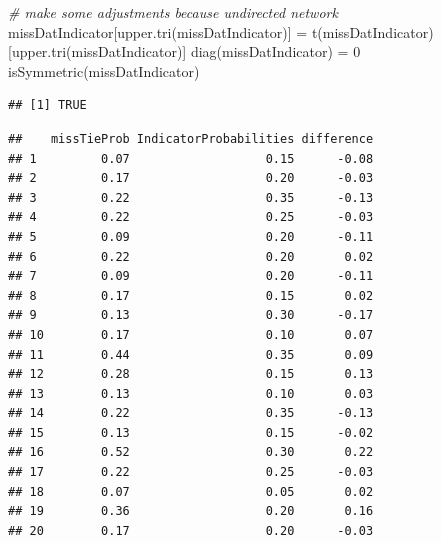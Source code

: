 \documentclass[
]{article}
\newenvironment{Shaded}{\begin{snugshade}}{\end{snugshade}}
\newcommand{\AttributeTok}[1]{\textcolor[rgb]{0.77,0.63,0.00}{#1}}
\newcommand{\CommentTok}[1]{\textcolor[rgb]{0.56,0.35,0.01}{\textit{#1}}}
\newcommand{\DecValTok}[1]{\textcolor[rgb]{0.00,0.00,0.81}{#1}}
\newcommand{\FunctionTok}[1]{\textcolor[rgb]{0.00,0.00,0.00}{#1}}
\newcommand{\NormalTok}[1]{#1}
\newcommand{\OtherTok}[1]{\textcolor[rgb]{0.56,0.35,0.01}{#1}}
\newcommand{\SpecialCharTok}[1]{\textcolor[rgb]{0.00,0.00,0.00}{#1}}
\begin{document}
\begin{Shaded}
\begin{Highlighting}[]
\CommentTok{\# make some adjustments because undirected network}
\NormalTok{missDatIndicator[}\FunctionTok{upper.tri}\NormalTok{(missDatIndicator)] }\OtherTok{=} \FunctionTok{t}\NormalTok{(missDatIndicator)[}\FunctionTok{upper.tri}\NormalTok{(missDatIndicator)]}
\FunctionTok{diag}\NormalTok{(missDatIndicator) }\OtherTok{=} \DecValTok{0}
\FunctionTok{isSymmetric}\NormalTok{(missDatIndicator)}
\end{Highlighting}
\end{Shaded}

\begin{verbatim}
## [1] TRUE
\end{verbatim}

\begin{Shaded}
\end{Shaded}

\begin{verbatim}
##    missTieProb IndicatorProbabilities difference
## 1         0.07                   0.15      -0.08
## 2         0.17                   0.20      -0.03
## 3         0.22                   0.35      -0.13
## 4         0.22                   0.25      -0.03
## 5         0.09                   0.20      -0.11
## 6         0.22                   0.20       0.02
## 7         0.09                   0.20      -0.11
## 8         0.17                   0.15       0.02
## 9         0.13                   0.30      -0.17
## 10        0.17                   0.10       0.07
## 11        0.44                   0.35       0.09
## 12        0.28                   0.15       0.13
## 13        0.13                   0.10       0.03
## 14        0.22                   0.35      -0.13
## 15        0.13                   0.15      -0.02
## 16        0.52                   0.30       0.22
## 17        0.22                   0.25      -0.03
## 18        0.07                   0.05       0.02
## 19        0.36                   0.20       0.16
## 20        0.17                   0.20      -0.03
\end{verbatim}
\end{document}
